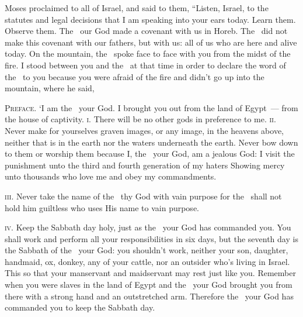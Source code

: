 
\begin{inparaenum}
   Moses proclaimed to all of Israel, and said to them, ``Listen, Israel, to the statutes and legal decisions that I am speaking into your ears today. Learn them. Observe them.%
   The \lord\ our God made a covenant with us in Horeb.%
   The \lord\ did not make this covenant with our fathers, but with us: all of us who are here and alive today.%
   On the mountain, the \lord\ spoke face to face with you from the midst of the fire.%
   I stood between you and the \lord\ at that time in order to declare the word of the \lord\ to you because you were afraid of the fire and didn't go up into the mountain, where he said,%

   \textsc{Preface.} `I am the \lord\ your God. I brought you out from the land of Egypt~--- from the house of captivity.%
   \textsc{i.} There will be no other gods in preference to me.%
   \textsc{ii.} Never make for yourselves graven images, or any image, in the heavens above, neither that is in the earth nor the waters underneath the earth.%
   Never bow down to them or worship them because I, the \lord\ your God, am a jealous God: I visit the punishment unto the third and fourth generation of my haters%
   Showing mercy unto thousands who love me and obey my commandments.%

   \textsc{iii.} Never take the name of the \lord\ thy God with vain purpose for the \lord\ shall not hold him guiltless who uses His name to vain purpose.%

   \textsc{iv.} Keep the Sabbath day holy, just as the \lord\ your God has commanded you.%
   You shall work and perform all your responsibilities in six days,%
   but the seventh day is the Sabbath of the \lord\ your God: you shouldn't work, neither your son, daughter, handmaid, ox, donkey, any of your cattle, nor an outsider who's living in Israel. This so that your manservant and maidservant may rest just like you.%
   Remember when you were slaves in the land of Egypt and the \lord\ your God brought you from there with a strong hand and an outstretched arm. Therefore the \lord\ your God has commanded you to keep the Sabbath day.%


\end{inparaenum}
